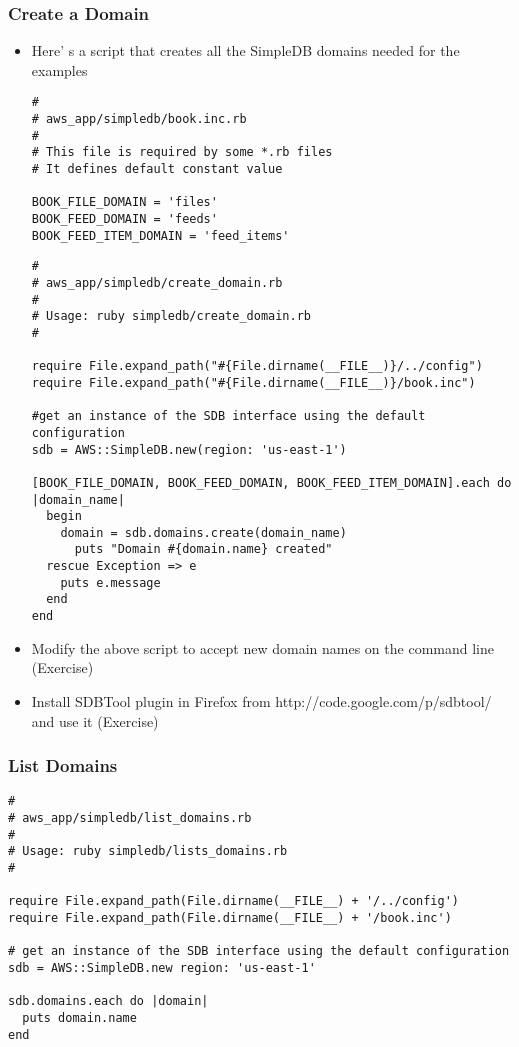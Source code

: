 \documentclass{beamer}
\begin{document}
\begin{frame}
\frametitle{Create a Domain}
\begin{itemize}
\item Here’ s a script that creates all the SimpleDB domains needed for the examples
\lstset{language=Ruby, style=eclipse}
\begin{lstlisting}[escapechar=!]
#
# aws_app/simpledb/book.inc.rb
#
# This file is required by some *.rb files
# It defines default constant value

BOOK_FILE_DOMAIN = 'files'
BOOK_FEED_DOMAIN = 'feeds'
BOOK_FEED_ITEM_DOMAIN = 'feed_items'
\end{lstlisting}
\lstset{language=Ruby, style=eclipse}
\begin{lstlisting}[escapechar=!]
#
# aws_app/simpledb/create_domain.rb
#
# Usage: ruby simpledb/create_domain.rb
#

require File.expand_path("#{File.dirname(__FILE__)}/../config")
require File.expand_path("#{File.dirname(__FILE__)}/book.inc")

#get an instance of the SDB interface using the default configuration
sdb = AWS::SimpleDB.new(region: 'us-east-1')

[BOOK_FILE_DOMAIN, BOOK_FEED_DOMAIN, BOOK_FEED_ITEM_DOMAIN].each do |domain_name|
  begin
    domain = sdb.domains.create(domain_name)
      puts "Domain #{domain.name} created"
  rescue Exception => e
    puts e.message
  end
end
\end{lstlisting}

\item Modify the above script to accept new domain names on the command line (Exercise)
\item Install SDBTool plugin in Firefox from http://code.google.com/p/sdbtool/ and use it (Exercise)
\end{itemize}

\end{frame}
\begin{frame}[fragile]
\frametitle{List Domains}

\lstset{language=Ruby, style=eclipse}
\begin{lstlisting}[escapechar=!]
#
# aws_app/simpledb/list_domains.rb
#
# Usage: ruby simpledb/lists_domains.rb
#

require File.expand_path(File.dirname(__FILE__) + '/../config')
require File.expand_path(File.dirname(__FILE__) + '/book.inc')

# get an instance of the SDB interface using the default configuration
sdb = AWS::SimpleDB.new region: 'us-east-1'

sdb.domains.each do |domain|
  puts domain.name
end
\end{lstlisting}

\end{frame}
\end{document}
